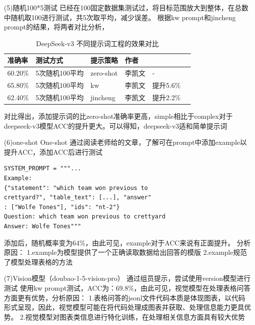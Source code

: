\documentclass[10.5pt,compsoc]{CjC}
\theoremstyle{mystyle}
\begin{document}
\begin{CJK*}{UTF8}{song}
(5)随机100*5测试
已经在100固定数据集测试过，将目标范围放大到整体，在总数中随机取100进行测试，共5次取平均，减少误差。
根据kw prompt和jincheng prompt的结果，将两者对比分析，

\begin{table}[h]   
\centering   
\caption{DeepSeek-v3 不同提示词工程的效果对比}   
\begin{tabular}{|l|l|l|l|l|l|}   
\hline   
准确率 & 测试方式 & 提示策略 & 作者 &\\ \hline   
60.20\% & 5次随机100平均 & zero-shot & 李凯文 & - \\ \hline   
65.80\% & 5次随机100平均 & kw& 李凯文 & 提升5.6\% \\ \hline   
62.40\% & 5次随机100平均 & jincheng& 李凯文 & 提升2.2\% \\ \hline   
\end{tabular}   
\end{table}
对比得出，添加提示词的比zero-shot准确率更高，simple相比于complex对于deepseek-v3模型ACC的提升更大。可以得知，deepseek-v3适和简单提示词

(6)one-shot
One-shot
通过阅读老师给的文章，了解可在prompt中添加example以提升ACC，添加ACC后进行测试
\begin{verbatim}
SYSTEM_PROMPT = """...
Example:
{"statement": "which team won previous to 
crettyard?", "table_text": [...], "answer"
: ["Wolfe Tones"], "ids": "nt-2"}
Question: which team won previous to crettyard
Answer: Wolfe Tones"""
\end{verbatim}
添加后，随机概率变为64\%，由此可见，example对于ACC来说有正面提升。
分析原因：
1.example为模型提供了一个正确读取数据给出回答的模版
2.example规范了模型处理表格的方法

(7)Vision模型（doubao-1-5-vision-pro）
通过组员提示，尝试使用version模型进行测试
使用kw prompt测试，ACC为：69.8\%，由此可见，视觉模型在处理表格问答方面更有优势，分析原因：
1.表格问答的jsonl文件代码本质是体现图表，以代码形式呈现，因此，视觉模型可能在将代码处理成图表并获取、处理信息能力更具优势。
2.视觉模型对图表类信息进行特化训练，在处理相关信息方面具有较大优势


\end{CJK*}
\end{document}
